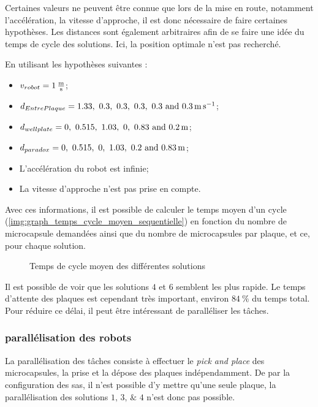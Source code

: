 Certaines valeurs ne peuvent être connue que lors de la mise en route, notamment l'accélération, la vitesse d'approche, il est donc nécessaire de faire certaines hypothèses. Les distances sont également arbitraires afin de se faire une idée du temps de cycle des solutions. Ici, la position optimale n'est pas recherché.

En utilisant les hypothèses suivantes :
\begin{itemize}
    \item $v_{robot} = \qty{1}{\frac{\m}{\s}}$;
    \item $d_{EntrePlaque} = \qtylist[list-units = single]{1.33; 0.3; 0.3; 0.3; 0.3; 0.3}{\m\per\s}$;
    \item $d_{wellplate} = \qtylist[list-units = single]{0; 0.515; 1.03; 0; 0.83; 0.2 }{\m}$;
    \item $d_{paradox} =      \qtylist[list-units = single]{0; 0.515; 0; 1.03; 0.2; 0.83 }{\m}$;
    \item L'accélération du robot est infinie;
    \item La vitesse d'approche n'est pas prise en compte.
\end{itemize}
Avec ces informations, il est possible de calculer le temps moyen d'un cycle (\cf \autoref{img:graph_temps_cycle_moyen_sequentielle}) en fonction du nombre de \gls{microcapsule} demandées ainsi que du nombre de \glspl{microcapsule} par plaque, et ce, pour chaque solution.
\begin{figure}[H]
    \centering
    
    \caption{Temps de cycle moyen des différentes solutions}
    \label{img:graph_temps_cycle_moyen_sequentielle}
\end{figure}
Il est possible de voir que les solutions $4$ et $6$ semblent les plus rapide. Le temps d'attente des plaques est cependant très important, environ $84~\%$ du temps total. Pour réduire ce délai, il peut être intéressant de paralléliser les tâches.
\subsubsection{parallélisation des robots}
La parallélisation des tâches consiste à effectuer le \textit{pick and place} des \glspl{microcapsule}, la prise et la dépose des plaques indépendamment.
De par la configuration des sas, il n'est possible d'y mettre qu'une seule plaque, la parallélisation des solutions $\numlist{1; 3; 4}$ n'est donc pas possible.

